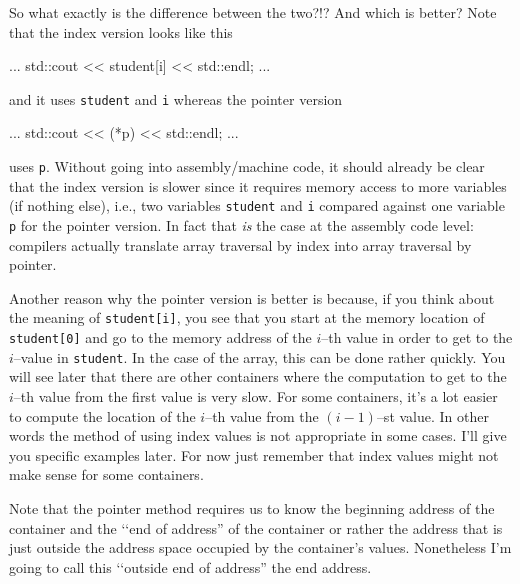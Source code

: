 So what exactly is the difference between the two?!?
And which is better?
Note that the index version looks like this
\begin{console}[frame=single,fontsize=\footnotesize]
...
    std::cout << student[i] << std::endl;
...
\end{console}
and it uses \verb!student! and \verb!i!
whereas the pointer version
\begin{console}[frame=single,fontsize=\footnotesize]
...
    std::cout << (*p) << std::endl;
...
\end{console}
uses \verb!p!.
Without going into assembly/machine code,
it should already be clear that the index version
is slower since it requires memory access to more
variables (if nothing else), i.e., two variables
\texttt{student} and \texttt{i}
compared against one variable \texttt{p} for the pointer version.
In fact that \textit{is} the case at the assembly code level:
compilers actually translate array traversal by index
into array traversal by pointer.

Another reason why the pointer version is better is
because, if you think about the meaning of
\verb!student[i]!, you see that you start at the
memory location of
\verb!student[0]! and go to the
memory address of the $i$--th value in order to get to the
$i$--value in \verb!student!.
In the case of the array, this can be done rather quickly.
You will see later that there are other containers where
the computation to get to the
$i$--th value from the first value is very slow.
For some containers, it's a lot easier to compute the location
of the $i$--th value from the $(i-1)$--st value.
In other words the method of using index values is not
appropriate in some cases.
I'll give you specific examples later.
For now just remember that index values might
not make sense for some containers.

Note that the pointer method requires us to know the
beginning address of the container and the
\lq\lq end of address'' of the container or rather
the address that is just outside the address space occupied
by the container's values.
Nonetheless I'm going to call this \lq\lq outside end of address''
the end address.
